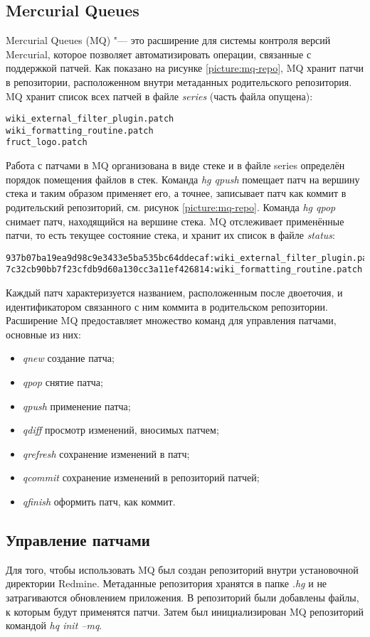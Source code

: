 \subsection{Mercurial Queues}
Mercurial Queues (MQ) "--- это расширение для системы контроля версий
Mercurial, которое позволяет автоматизировать операции, связанные с поддержкой
патчей. Как показано на рисунке \ref{picture:mq-repo}, MQ хранит патчи в
репозитории, расположенном внутри метаданных родительского репозитория. MQ
хранит список всех патчей в файле \textit{series} (часть файла опущена):
\small{\begin{lstlisting}
wiki_external_filter_plugin.patch
wiki_formatting_routine.patch
fruct_logo.patch
\end{lstlisting}}
Работа с патчами в MQ организована в виде стеке и в файле series определён
порядок помещения файлов в стек. Команда \textit{hg qpush} помещает патч на
вершину стека и таким образом применяет его, а точнее, записывает патч как
коммит в родительский репозиторий, см. рисунок \ref{picture:mq-repo}. Команда
\textit{hg qpop} снимает патч, находящийся на вершине стека. MQ отслеживает
применённые патчи, то есть текущее состояние стека, и хранит их список в файле
\textit{status}:
\small{\begin{lstlisting}
937b07ba19ea9d98c9e3433e5ba535bc64ddecaf:wiki_external_filter_plugin.patch
7c32cb90bb7f23cfdb9d60a130cc3a11ef426814:wiki_formatting_routine.patch
\end{lstlisting}}
Каждый патч характеризуется названием, расположенным после двоеточия, и
идентификатором связанного с ним коммита в родительском репозитории.
Расширение MQ предоставляет множество команд для управления патчами, основные
из них:
\begin{itemize}
  \item \textit{qnew} создание патча;
  \item \textit{qpop} снятие патча;
  \item \textit{qpush} применение патча;
  \item \textit{qdiff} просмотр изменений, вносимых патчем;
  \item \textit{qrefresh} сохранение изменений в патч;
  \item \textit{qcommit} сохранение изменений в репозиторий патчей;
  \item \textit{qfinish} оформить патч, как коммит.
\end{itemize}

\subsection{Управление патчами}
Для того, чтобы использовать MQ был создан репозиторий внутри
установочной директории Redmine. Метаданные репозитория хранятся в папке
\textit{.hg} и не затрагиваются обновлением приложения. В репозиторий
были добавлены файлы, к которым будут применятся патчи. Затем был
инициализирован MQ репозиторий командой \textit{hq init --mq}.

